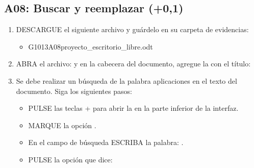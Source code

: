 \documentclass[letterpaper,10pt,spanish]{sphinxmanual}
\begin{document}
\subsection{A08: Buscar y reemplazar  (+0,1)}
\label{\detokenize{1_guias/10ofimatica/G1013:a08-buscar-y-reemplazar-124-0-1}}
\sphinxAtStartPar
{}
\begin{enumerate}
%
\item {} 
\sphinxAtStartPar
DESCARGUE el siguiente archivo y guárdelo en su carpeta de evidencias:
\begin{itemize}
\item {} 
\sphinxAtStartPar
G1013A08\sphinxhyphen{}proyecto\_escritorio\_libre.odt 

\end{itemize}

\item {} 
\sphinxAtStartPar
ABRA el archivo:  y en la cabecera del documento, agregue la  con el título: 

\item {} 
\sphinxAtStartPar
Se debe realizar un búsqueda de la palabra aplicaciones en el texto del documento. Siga los siguientes pasos:
\begin{itemize}
\item {} 
\sphinxAtStartPar
PULSE las teclas  +  para abrir la  en la parte inferior de la interfaz.

\item {} 
\sphinxAtStartPar
MARQUE la opción .

\item {} 
\sphinxAtStartPar
En el campo de búsqueda ESCRIBA la palabra: .

\item {} 
\sphinxAtStartPar
PULSE la opción que dice: 


\end{itemize}
\end{enumerate}
\end{document}
